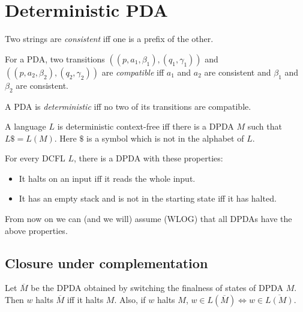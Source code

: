 
\section{Deterministic PDA}

\begin{definition}
Two strings are \emph{consistent} iff one is a prefix of the other.
\end{definition}
\begin{definition}
For a PDA, two transitions $((p, a_1, \beta_1), (q_1, \gamma_1))$
and $((p, a_2, \beta_2), (q_2, \gamma_2))$ are \emph{compatible} iff
$a_1$ and $a_2$ are consistent and $\beta_1$ and $\beta_2$ are consistent.
\end{definition}
\begin{definition}
A PDA is \emph{deterministic} iff no two of its transitions are compatible.
\end{definition}
\begin{definition}
A language $L$ is deterministic context-free iff there is a DPDA $M$
such that $L\$ = L(M)$. Here $\$$ is a symbol which is not in the alphabet of $L$.
\end{definition}

\begin{theorem}
\label{halt-properties}
For every DCFL $L$,
there is a DPDA with these properties:
\begin{itemize}
\item It halts on an input iff it reads the whole input.
\item It has an empty stack and is not in the starting state iff it has halted.
\end{itemize}
\end{theorem}
From now on we can (and we will) assume (WLOG) that all DPDAs have the above properties.

\subsection{Closure under complementation}

\begin{theorem}
\label{dpda-complement}
Let $\overline{M}$ be the DPDA obtained by switching the finalness of states of DPDA $M$.
Then $w$ halts $\overline{M}$ iff it halts $M$.
Also, if $w$ halts $M$, $w \in L(\overline{M}) \iff w \in \overline{L(M)}$.
\end{theorem}

